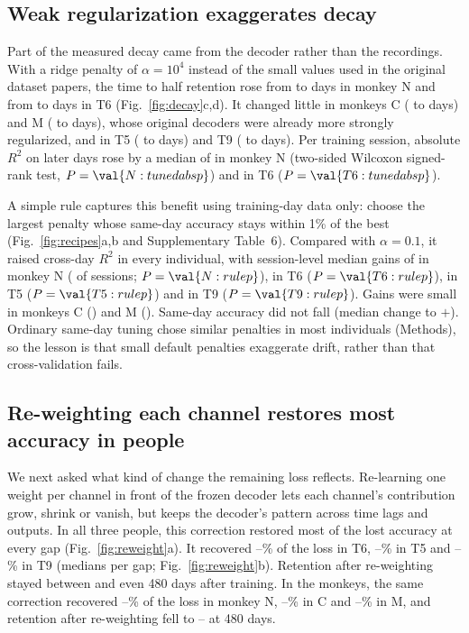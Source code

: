 \documentclass[pdflatex,sn-nature]{sn-jnl}
\begin{document}
\subsection*{Weak regularization exaggerates decay}

Part of the measured decay came from the decoder rather than the recordings. With a ridge penalty of $\alpha = 10^4$
instead of the small values used in the original dataset papers\cite{temmar2025}, the time to half retention rose from
 to  days in monkey N and from  to  days in T6
(Fig.~\ref{fig:decay}c,d). It changed little in monkeys C ( to  days) and M
( to  days), whose original decoders were already more strongly regularized, and in T5
( to  days) and T9 ( to  days). Per training session,
absolute $R^2$ on later days rose by a median of  in monkey N (two-sided Wilcoxon signed-rank test,
$P = \val{N:tunedabsp}$) and  in T6 ($P = \val{T6:tunedabsp}$).

A simple rule captures this benefit using training-day data only: choose the largest penalty whose same-day accuracy
stays within 1\% of the best (Fig.~\ref{fig:recipes}a,b and Supplementary Table~6). Compared with $\alpha = 0.1$, it
raised cross-day $R^2$ in every individual, with session-level median gains of  in monkey N
( of  sessions; $P = \val{N:rulep}$),  in T6 ($P = \val{T6:rulep}$),
 in T5 ($P = \val{T5:rulep}$) and  in T9 ($P = \val{T9:rulep}$). Gains were small in
monkeys C () and M (). Same-day accuracy did not fall (median change  to
$+$). Ordinary same-day tuning chose similar penalties in most individuals (Methods), so the lesson is
that small default penalties exaggerate drift, rather than that cross-validation fails.

\subsection*{Re-weighting each channel restores most accuracy in people}

We next asked what kind of change the remaining loss reflects. Re-learning one weight per channel in front of the frozen
decoder lets each channel's contribution grow, shrink or vanish, but keeps the decoder's pattern across time lags and
outputs. In all three people, this correction restored most of the lost accuracy at every gap (Fig.~\ref{fig:reweight}a).
It recovered --\% of the loss in T6, --\% in T5 and
--\% in T9 (medians per gap; Fig.~\ref{fig:reweight}b). Retention after re-weighting stayed
between  and  even 480 days after training. In the monkeys, the same correction
recovered --\% of the loss in monkey N, --\% in C and
--\% in M, and retention after re-weighting fell to -- at
480 days.
\end{document}
